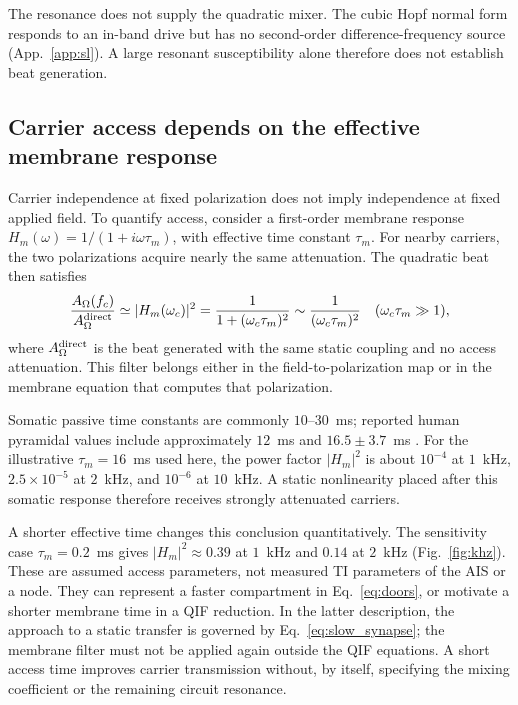 \documentclass[11pt,a4paper]{article}
\begin{document}
The resonance does not supply the quadratic mixer. The cubic Hopf normal form
responds to an in-band drive but has no second-order difference-frequency source
(App.~\ref{app:sl}). A large resonant susceptibility alone therefore does not
establish beat generation.

\subsection{Carrier access depends on the effective membrane response}\label{sec:khz}
Carrier independence at fixed polarization does not imply independence at fixed
applied field. To quantify access, consider a first-order membrane response
$H_m(\omega)=1/(1+i\omega\tau_m)$, with effective time constant $\tau_m$.
For nearby carriers, the two polarizations acquire nearly the same attenuation.
The quadratic beat then satisfies
\begin{equation}
\frac{A_\Omega(f_c)}{A_\Omega^{\rm direct}}
\simeq |H_m(\omega_c)|^2
=\frac{1}{1+(\omega_c\tau_m)^2}
\sim\frac{1}{(\omega_c\tau_m)^2}
\quad(\omega_c\tau_m\gg1),
\label{eq:khz}
\end{equation}
where $A_\Omega^{\rm direct}$ is the beat generated with the same static coupling
and no access attenuation. This filter belongs either in the field-to-polarization
map or in the membrane equation that computes that polarization.

Somatic passive time constants are commonly $10$--$30$~ms; reported human pyramidal
values include approximately $12$~ms \cite{deitcher2017} and $16.5\pm3.7$~ms
\cite{eyal2016}. For the illustrative $\tau_m=16$~ms used here, the power factor
$|H_m|^2$ is about $10^{-4}$ at $1$~kHz, $2.5\times10^{-5}$ at $2$~kHz, and
$10^{-6}$ at $10$~kHz. A static nonlinearity placed after this somatic response
therefore receives strongly attenuated carriers.

A shorter effective time changes this conclusion quantitatively. The sensitivity
case $\tau_m=0.2$~ms gives $|H_m|^2\approx0.39$ at $1$~kHz and $0.14$ at $2$~kHz
(Fig.~\ref{fig:khz}). These are assumed access parameters, not measured TI
parameters of the AIS or a node. They can represent a faster compartment in
Eq.~\eqref{eq:doors}, or motivate a shorter membrane time in a QIF reduction.
In the latter description, the approach to a static transfer is governed by
Eq.~\eqref{eq:slow_synapse}; the membrane filter must not be applied again outside
the QIF equations. A short access time improves carrier transmission without,
by itself, specifying the mixing coefficient or the remaining circuit resonance.
\end{document}
